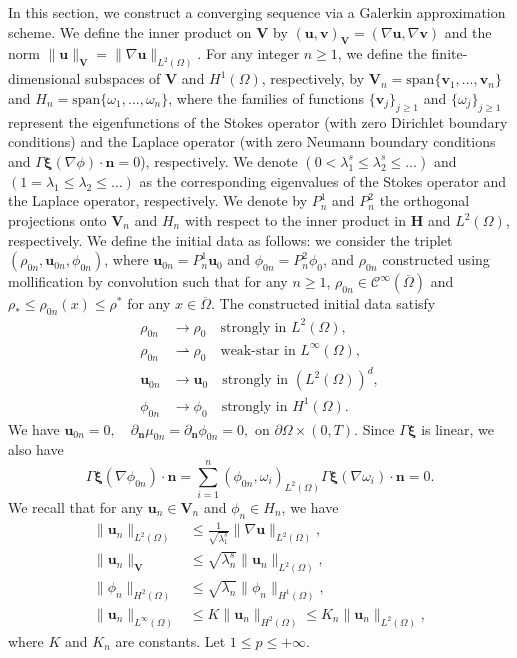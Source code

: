 \documentclass[11pt]{article}
\def\bfV{\mathbf{V}}
\def\bfu{\mathbf{u}}
\def\bfn{\mathbf{n}}
\def\bfxi{\boldsymbol{\xi}}
\def\Ga{\Gamma}
\begin{document}
In this section, we construct a converging sequence via a Galerkin approximation scheme. We define the inner product on $\mathbf{V}$ by $(\mathbf{u},\mathbf{v})_{\mathbf{V}} = (\nabla\mathbf{u},\nabla\mathbf{v})$ and the norm $\|\mathbf{u}\|_{\mathbf{V}} = \|\nabla\mathbf{u}\|_{L^2(\Omega)}$. For any integer $n \geq 1$, we define the finite-dimensional subspaces of $\mathbf{V}$ and $H^1(\Omega)$, respectively, by $\mathbf{V}_n = \text{span}\{\mathbf{v}_1,\ldots,\mathbf{v}_n\}$ and $H_n = \text{span}\{\omega_1,\ldots,\omega_n\}$, where the families of functions $\{\mathbf{v}_j\}_{j\geq 1}$ and $\{\omega_j\}_{j\geq 1}$ represent the eigenfunctions of the Stokes operator (with zero Dirichlet boundary conditions) and the Laplace operator (with zero Neumann boundary conditions and $\Gamma \bfxi(\nabla\phi)\cdot\bfn = 0$), respectively. We denote $(0 < \lambda_1^s \leq \lambda_2^s \leq \ldots)$ and $(1 = \lambda_1 \leq \lambda_2 \leq \ldots)$ as the corresponding eigenvalues of the Stokes operator and the Laplace operator, respectively. We denote by $P_n^1$ and $P_n^2$ the orthogonal projections onto $\mathbf{V}_n$ and $H_n$ with respect to the inner product in $\mathbf{H}$ and $L^2(\Omega)$, respectively. We define the initial data as follows: we consider the triplet $(\rho_{0n},\mathbf{u}_{0n},\phi_{0n})$, where $\mathbf{u}_{0n} = P_n^1\mathbf{u}_0$ and $\phi_{0n} = P_n^{2}\phi_0$, and $\rho_{0n}$ constructed using mollification by convolution such that for any $n \geq 1$, $\rho_{0n} \in \mathcal{C}^{\infty}(\overline{\Omega})$ and $\rho_{*} \leq \rho_{0n}(x) \leq \rho^{*}$ for any $x \in \overline{\Omega}$. The constructed initial data satisfy
\begin{align}
\rho_{0n} &\rightarrow \rho_0 \quad \text{strongly in } L^2(\Omega), \\
\rho_{0n} &\rightharpoonup \rho_0 \quad \text{weak-star in } L^{\infty}(\Omega), \\
\mathbf{u}_{0n} &\rightarrow \mathbf{u}_0 \quad \text{strongly in } (L^2(\Omega))^d, \\
\phi_{0n} &\rightarrow \phi_0 \quad \text{strongly in } H^1(\Omega). \label{phi_0m}
\end{align}
We have $\bfu_{0n} = 0, \quad\partial_{\bfn}\mu_{0n} = \partial_{\bfn}\phi_{0n} = 0, \text{ on } \partial\Omega\times(0,{T})$. Since $\Ga\bfxi$ is linear, we also have
$$\Ga\bfxi(\nabla\phi_{0n})\cdot\bfn = \sum_{i=1}^n(\phi_{0n},\omega_i)_{L^2(\Omega)} \Ga\bfxi(\nabla\omega_i)\cdot\bfn=0.$$
We recall that for any $\bfu_n \in \bfV_n$ and $\phi_n\in H_n$, we have
\begin{align}
\|\mathbf{u}_n\|_{L^2(\Omega)} &\leq \frac{1}{\sqrt{\lambda_1^s}} \|\nabla\mathbf{u}\|_{L^2(\Omega)}, \label{poincare_ineq} \\
\|\mathbf{u}_n\|_{\mathbf{V}} &\leq \sqrt{\lambda_n^s}\|\mathbf{u}_n\|_{L^2(\Omega)}, \\
\|\phi_n\|_{H^2(\Omega)} &\leq \sqrt{\lambda_n}\|\phi_n\|_{H^1(\Omega)}, \\
\|\mathbf{u}_n\|_{L^{\infty}(\Omega)} &\leq K\|\mathbf{u}_n\|_{H^2(\Omega)} \leq K_n \|\mathbf{u}_n\|_{L^2(\Omega)},\label{u_n_inq}
\end{align}
where $K$ and $K_n$ are constants. Let $1\leq p\leq +\infty$.
\end{document}
